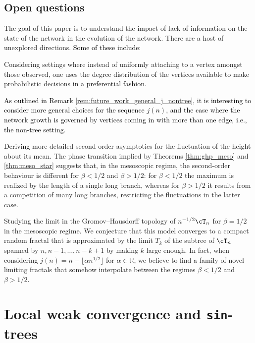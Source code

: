 \documentclass[letterpaper,11pt,reqno]{amsart}
\newenvironment{enumeratea}{\begin{enumerate}[\upshape a)]\setlength{\itemsep}{1ex}}{\end{enumerate}}
\theoremstyle{definition}
\begin{document}

\subsection{Open questions}\label{sec:open_probs}
The goal of this paper is to understand the impact of lack of information on the state of the network in the evolution of the network. There are a host of unexplored directions. \textcolor{black}{Some of these include:}
\begin{enumeratea}
    \item Considering settings where instead of uniformly attaching to a vertex amongst those observed, one uses the degree distribution of the vertices available to make probabilistic decisions \textcolor{black}{in a preferential fashion.}
    \textcolor{black}{\item As outlined in Remark \ref{rem:future_work_general_j_nontree}, it is interesting to consider more general choices for the sequence $j(n)$, and the case where the network growth is governed by vertices coming in with more than one edge, i.e., the non-tree setting.}
    \item \textcolor{black}{Deriving} more detailed second order asymptotics for the fluctuation of the height about its mean. {The phase transition implied by Theorems \ref{thm:ghp_meso} and \ref{thm:meso_star} suggests that, in the mesoscopic regime, the second-order behaviour is different for $\beta<1/2$ and $\beta>1/2$: for $\beta<1/2$ the maximum is realized by the length of a single long branch, whereas for $\beta>1/2$ it results from a competition of many long branches, restricting the fluctuations in the latter case.}
    \item {Studying the limit in the Gromov--Hausdorff topology of $n^{-1/2}\cT_n$ for $\beta=1/2$ in the mesoscopic regime.  We conjecture that this model converges to a compact random fractal that is approximated by the limit $T_k$ of the subtree of $\cT_n$ spanned by $n, n-1,\dots,n-k+1$ by making $k$ large enough. In fact, when considering $j(n)=n-\lfloor \alpha n^{1/2} \rfloor$ for $\alpha\in \mathbb{R}$, we believe to find a family of novel limiting fractals that somehow interpolate between the regimes $\beta<1/2$ and $\beta>1/2$. }
\end{enumeratea}



\section{Local weak convergence and {\tt sin}-trees}
\label{sec:local-wll}
\end{document}
